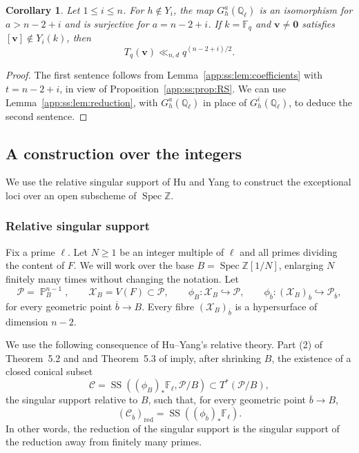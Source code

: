 \documentclass[a4paper,11pt, twoside,reqno]{amsart}
\theoremstyle{plain}
\newtheorem{cor}[thm]{Corollary}
\theoremstyle{definition}
\theoremstyle{remark}
\newcommand{\bfv}{\bm{v}}
\newcommand{\ZZ}{\mathbb{Z}}
\newcommand{\QQ}{\mathbb{Q}}
\DeclareMathOperator{\PP}{\mathbb{P}}
\DeclareMathOperator{\Spec}{Spec}
\renewcommand{\bar}{\overline}
\renewcommand{\le}{\leqslant}
\renewcommand{\ge}{\geqslant}
\newcommand{\FF}{\mathbb{F}}
\numberwithin{equation}{section}
\begin{document}
\begin{cor}\label{app:ss:cor:Ql}
Let $1\le i\le n$.
For $h\notin Y_i$, the map $G_h^a(\QQ_\ell)$
is an isomorphism for $a>n-2+i$
and is surjective for $a=n-2+i$.
If $k=\FF_q$ and
$\bfv\neq\bm0$ satisfies $[\bfv]\notin Y_i(k)$, then
$$T_q(\bfv)\ll_{n,d} q^{(n-2+i)/2}.$$
\end{cor}
\begin{proof}
The first sentence follows from Lemma~\ref{app:ss:lem:coefficients} with $t=n-2+i$,
in view of Proposition~\ref{app:ss:prop:RS}.
We can use Lemma~\ref{app:ss:lem:reduction},
with $G_h^a(\QQ_\ell)$ in place of $G_h^i(\QQ_\ell)$,
to deduce the second sentence.
\end{proof}

\subsection{A construction over the integers}
We use the relative singular support of Hu and Yang \cite{HY} to
construct the exceptional loci over an open subscheme of $\Spec\ZZ$.
\subsubsection{Relative singular support}
Fix a prime $\ell$.
Let $N\ge 1$ be an integer multiple of $\ell$
and all primes dividing the content of $F$.
We will work over the base $B=\Spec\ZZ[1/N]$,
enlarging $N$ finitely many times without changing the notation.
Let
\[
 \mathcal P=\PP^{n-1}_B,\qquad
 \mathcal X_B=V(F)\subset\mathcal P,\qquad
 \phi_B:\mathcal X_B \hookrightarrow \mathcal P,\qquad
 \phi_{\bar b}:(\mathcal X_B)_{\bar b} \hookrightarrow \mathcal P_{\bar b},
\]
for every geometric point $\bar b\to B$.
Every fibre $(\mathcal X_B)_{\bar b}$ is a hypersurface of dimension $n-2$.

We use the following consequence of Hu--Yang's relative theory.
Part (2) of Theorem~5.2 and  and Theorem~5.3 of \cite{HY} imply, after shrinking $B$, the
existence of a closed conical subset
\begin{equation*}
 \mathcal C=\operatorname{SS}((\phi_B)_\ast\FF_\ell,\mathcal P/B)
                         \subset T^*(\mathcal P/B),
\end{equation*}
the singular support relative to $B$, such that, for every geometric point $\bar b\to B$,
\begin{equation}\label{app:ss:eq:relative-fibre}
 (\mathcal C_{\bar b})_{\mathrm{red}}
       =\operatorname{SS}((\phi_{\bar b})_\ast\FF_\ell).
\end{equation}
In other words, the reduction of the singular support is the singular support of the reduction away from finitely many primes.
\end{document}
